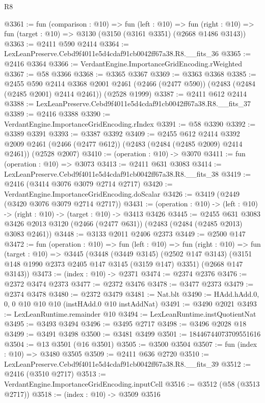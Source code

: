\begin{lexlean}{R8}
\begin{coremodule}
@3361 := fun (comparison : @10) =>
  fun (left : @10) =>
  fun (right : @10) => fun (target : @10) => @3130 (@3150 (@3161 @3351) (@2668 @1486 @3143))
@3363 := @2411 @590 @2414
@3364 := LexLeanPreserve.Cebd9f4011e5d4cdaf91cb0042ff67a38.R8.__fits_36
@3365 := @2416 @3364
@3366 := VerdantEngine.ImportanceGridEncoding.rWeighted
@3367 := @58 @3366
@3368 := @3365 @3367
@3369 := @3363 @3368
@3385 := @2455
    @590
    @2414
    @3368
    @2001
    @2461
    (@2466 (@2477 @590))
    (@2483 (@2484 (@2485 @2001) @2414 @2461))
    (@2528 @1999)
@3387 := @2411 @612 @2414
@3388 := LexLeanPreserve.Cebd9f4011e5d4cdaf91cb0042ff67a38.R8.__fits_37
@3389 := @2416 @3388
@3390 := VerdantEngine.ImportanceGridEncoding.rIndex
@3391 := @58 @3390
@3392 := @3389 @3391
@3393 := @3387 @3392
@3409 := @2455
    @612
    @2414
    @3392
    @2009
    @2461
    (@2466 (@2477 @612))
    (@2483 (@2484 (@2485 @2009) @2414 @2461))
    (@2528 @2007)
@3410 := (operation : @10) -> @3070
@3411 := fun (operation : @10) => @3073
@3413 := @2411 @631 @3083
@3414 := LexLeanPreserve.Cebd9f4011e5d4cdaf91cb0042ff67a38.R8.__fits_38
@3419 := @2416 (@3414 @3076 @3079 @2714 @2717)
@3420 := VerdantEngine.ImportanceGridEncoding.doScalar
@3426 := @3419 (@2449 (@3420 @3076 @3079 @2714 @2717))
@3431 := (operation : @10) -> (left : @10) -> (right : @10) -> (target : @10) -> @3413 @3426
@3445 := @2455
    @631
    @3083
    @3426
    @2013
    @3120
    (@2466 (@2477 @631))
    (@2483 (@2484 (@2485 @2013) @3083 @2461))
@3448 := @3133 @2011 @2406 @2373
@3449 := @2500 @147
@3472 := fun (operation : @10) =>
  fun (left : @10) =>
  fun (right : @10) =>
  fun (target : @10) =>
  @3445
    (@3448
      (@3449 @3145)
      (@2502 @147 @3143)
      (@3151 @148 @1990 @2373 @2405 @147 @3145 (@3159 @147) @3351)
      (@2668 @147 @3143))
@3473 := (index : @10) -> @2371
@3474 := @2374 @2376
@3476 := @2372 @3474 @2373
@3477 := @2372 @3476
@3478 := @3477 @2373
@3479 := @2374 @3478
@3480 := @2372 @3479
@3481 := Nat.blt
@3490 := HAdd.hAdd.{0, 0, 0} @10 @10 @10 (instHAdd.{0} @10 instAddNat)
@3491 := @3490 @2021
@3493 := LexLeanRuntime.remainder @10
@3494 := LexLeanRuntime.instQuotientNat
@3495 := @3493 @3494
@3496 := @3495 @2717
@3498 := @3496 @2028 @18
@3499 := @3491 @3498
@3500 := @3481 @3499
@3501 := 18446744073709551616
@3504 := @13 @3501 (@16 @3501)
@3505 := @3500 @3504
@3507 := fun (index : @10) => @3480 @3505
@3509 := @2411 @636 @2720
@3510 := LexLeanPreserve.Cebd9f4011e5d4cdaf91cb0042ff67a38.R8.__fits_39
@3512 := @2416 (@3510 @2717)
@3513 := VerdantEngine.ImportanceGridEncoding.inputCell
@3516 := @3512 (@58 (@3513 @2717))
@3518 := (index : @10) -> @3509 @3516

\end{coremodule}
\end{lexlean}
